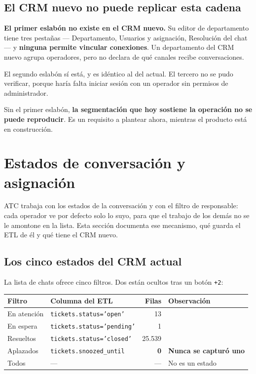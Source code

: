 \documentclass[11pt,a4paper]{article}
\newcommand{\cod}[1]{\texttt{\small #1}}
\begin{document}
\subsection{El CRM nuevo no puede replicar esta cadena}

\begin{alerta}
\textbf{El primer eslabón no existe en el CRM nuevo.} Su editor de departamento tiene tres
pestañas --- Departamento, Usuarios y asignación, Resolución del chat --- y
\textbf{ninguna permite vincular conexiones}. Un departamento del CRM nuevo agrupa
operadores, pero no declara de qué canales recibe conversaciones.

\vspace{0.4em}
El segundo eslabón sí está, y es idéntico al del actual. El tercero no se pudo verificar,
porque haría falta iniciar sesión con un operador sin permisos de administrador.

\vspace{0.4em}
Sin el primer eslabón, \textbf{la segmentación que hoy sostiene la operación no se puede
reproducir}. Es un requisito a plantear ahora, mientras el producto está en construcción.
\end{alerta}

\section{Estados de conversación y asignación}
\label{sec:estados}

ATC trabaja con los estados de la conversación y con el filtro de responsable: cada
operador ve por defecto solo lo suyo, para que el trabajo de los demás no se le
amontone en la lista. Esta sección documenta ese mecanismo, qué guarda el ETL de él y
qué tiene el CRM nuevo.

\subsection{Los cinco estados del CRM actual}

La lista de chats ofrece cinco filtros. Dos están ocultos tras un botón \cod{+2}:

\begin{center}
\begin{tabularx}{\textwidth}{@{}llrL@{}}
\toprule
\textbf{Filtro} & \textbf{Columna del ETL} & \textbf{Filas} & \textbf{Observación} \\
\midrule
En atención & \cod{tickets.status='open'}    & 13     & \\
En espera   & \cod{tickets.status='pending'} & 1      & \\
Resueltos   & \cod{tickets.status='closed'}  & 25.539 & \\
Aplazados   & \cod{tickets.snoozed\_until}   & \textbf{0} & \textbf{Nunca se capturó uno} \\
Todos       & ---                            & ---    & No es un estado \\
\bottomrule
\end{tabularx}
\end{center}
\end{document}
